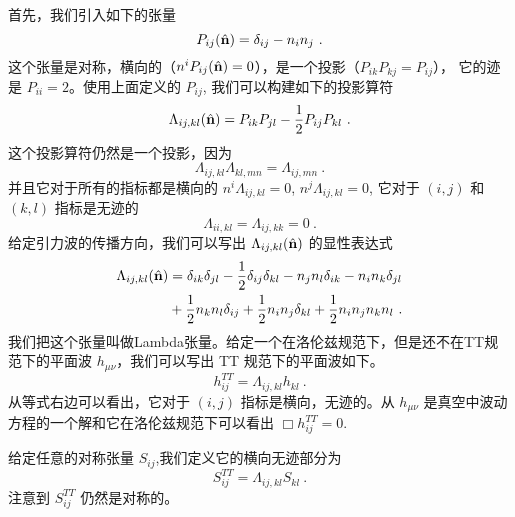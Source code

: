 首先，我们引入如下的张量
\begin{equation}
P_{ij} (\hat{\bf{n}} ) = \delta_{ij} - n_in_j~.
\end{equation}
这个张量是对称，横向的（$ n^iP_{ij}(\hat{\bf{n}}) = 0 $），是一个投影（$ P_{ik} P_{kj} = P_{ij}$）， 它的迹是 $P_{ii} = 2$。使用上面定义的 $P_{ij}$, 我们可以构建如下的投影算符
\begin{equation}
\Lambda_{ij,kl} ( \hat{\bf{n}} )  = P_{ik} P_{jl} - \frac{1}{2} P_{ij} P_{kl} ~. 
\end{equation}
这个投影算符仍然是一个投影，因为
\begin{equation}
\Lambda_{ij,kl} \Lambda_{kl,mn} = \Lambda_{ij,mn} ~. 
\end{equation}
并且它对于所有的指标都是横向的 $ n^i \Lambda_{ij,kl} = 0 $, $ n^j \Lambda_{ij,kl} = 0 $, 它对于 $(i,j)$ 和 $(k,l)$ 指标是无迹的
\begin{equation}
\Lambda_{ii,kl} = \Lambda_{ij,kk} = 0 ~. 
\end{equation}
给定引力波的传播方向，我们可以写出 $\Lambda_{ij,kl} (\hat{ {\bf n} })$ 的显性表达式
\begin{equation}
\begin{aligned}
\Lambda_{ij,kl} (\hat{ {\bf n} }   ) & = \delta_{ik} \delta_{jl} - \frac{1}{2} \delta_{ij} \delta_{kl} - n_j n_l \delta_{ik} - n_i n_k \delta_{jl} \\
& + \frac{1}{2} n_k n_l \delta_{ij} + \frac{1}{2} n_i n_j \delta_{kl} + \frac{1}{2} n_i n_j n_k n_l ~.
\end{aligned}
\end{equation}
我们把这个张量叫做Lambda张量。给定一个在洛伦兹规范下，但是还不在TT规范下的平面波 $h_{\mu\nu}$，我们可以写出 TT 规范下的平面波如下。
\begin{equation}
h_{ij}^{TT} = \Lambda_{ij,kl} h_{kl} ~.
\end{equation}
从等式右边可以看出，它对于 $(i,j)$ 指标是横向，无迹的。从 $h_{\mu\nu}$ 是真空中波动方程的一个解和它在洛伦兹规范下可以看出 $\Box h_{ij}^{TT} = 0$. 

给定任意的对称张量 $S_{ij}$,我们定义它的横向无迹部分为
\begin{equation}
S^{TT}_{ij} = \Lambda_{ij,kl} S_{kl} ~.
\end{equation}
注意到 $S^{TT}_{ij}$ 仍然是对称的。


